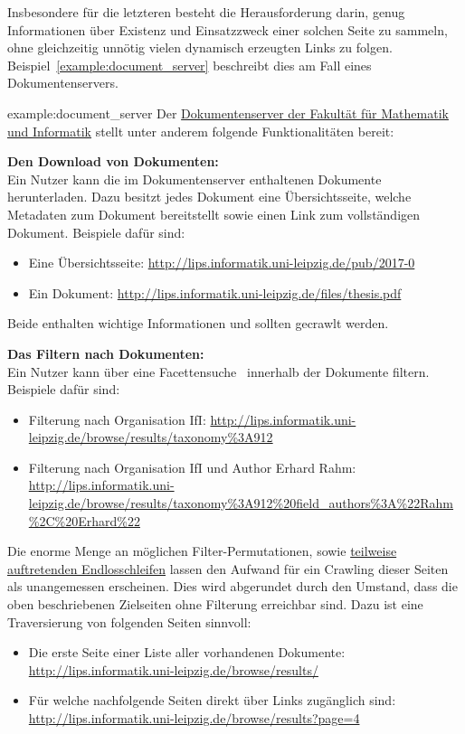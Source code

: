 Insbesondere für die letzteren besteht die Herausforderung darin,
genug Informationen über Existenz und Einsatzzweck einer solchen Seite zu sammeln,
ohne gleichzeitig unnötig vielen dynamisch erzeugten Links zu folgen.
Beispiel~\ref{example:document_server} beschreibt dies am Fall eines Dokumentenservers.

\begin{example}{example:document_server}
	Der \href{http://lips.informatik.uni-leipzig.de/}{Dokumentenserver der Fakultät für Mathematik und Informatik}
	stellt unter anderem folgende Funktionalitäten bereit:

	\textbf{Den Download von Dokumenten:}\\
	Ein Nutzer kann die im Dokumentenserver enthaltenen Dokumente herunterladen.
	Dazu besitzt jedes Dokument eine Übersichtsseite, welche Metadaten zum Dokument bereitstellt sowie
	einen Link zum vollständigen Dokument.
	Beispiele dafür sind:
	\begin{itemize}
		\item Eine Übersichtsseite: \url{http://lips.informatik.uni-leipzig.de/pub/2017-0}
		\item Ein Dokument: \url{http://lips.informatik.uni-leipzig.de/files/thesis.pdf}
	\end{itemize}
	Beide enthalten wichtige Informationen und sollten gecrawlt werden.

	\textbf{Das Filtern nach Dokumenten:}\\
	Ein Nutzer kann über eine Facettensuche~\cite{wiki.facetted_search} innerhalb der Dokumente filtern.
	Beispiele dafür sind:
	\begin{itemize}
		\item Filterung nach \glqq Organisation IfI\grqq: \url{http://lips.informatik.uni-leipzig.de/browse/results/taxonomy%3A912}
		\item Filterung nach \glqq Organisation IfI und Author Erhard Rahm\grqq:\\ \url{http://lips.informatik.uni-leipzig.de/browse/results/taxonomy%3A912%20field_authors%3A%22Rahm%2C%20Erhard%22}
	\end{itemize}
	Die enorme Menge an möglichen Filter-Permutationen,
	sowie \href{http://se-pubs.dbs.uni-leipzig.de/pubs/results/0%200%200%200%20taxonomy%3A30%2C696}
		{teilweise auftretenden Endlosschleifen} lassen den Aufwand für ein Crawling dieser Seiten als unangemessen erscheinen.
	Dies wird abgerundet durch den Umstand, dass die oben beschriebenen Zielseiten ohne Filterung erreichbar sind.
	Dazu ist eine Traversierung von folgenden Seiten sinnvoll:
	\begin{itemize}
		\item Die erste Seite einer Liste aller vorhandenen Dokumente: \url{http://lips.informatik.uni-leipzig.de/browse/results/}
		\item Für welche nachfolgende Seiten direkt über Links zugänglich sind:
		\url{http://lips.informatik.uni-leipzig.de/browse/results?page=4}
	\end{itemize}
\end{example}

